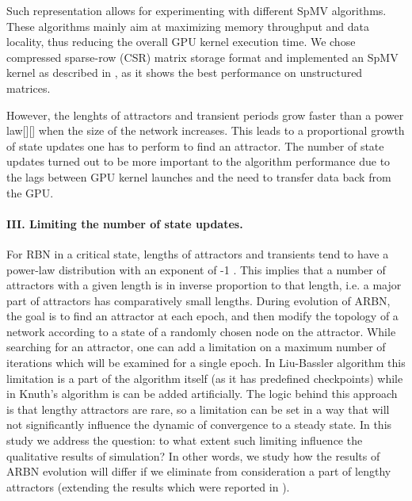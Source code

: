 \documentclass[procedia]{easychair}
\begin{document}
	 Such representation allows for experimenting with different SpMV algorithms. These algorithms mainly aim at maximizing memory throughput and data locality, thus reducing the overall GPU kernel execution time. We chose compressed sparse-row (CSR) matrix storage format and implemented an SpMV kernel as described in \cite{bell2008efficient}, as it shows the best performance on unstructured matrices.
	
	However, the lenghts of attractors and transient periods grow faster than a power law[][] when the size of the network increases. This leads to a proportional growth of state updates one has to perform to find an attractor. The number of state updates turned out to be more important to the algorithm performance due to the lags between GPU kernel launches and the need to transfer data back from the GPU. 
	
	\paragraph{III. Limiting the number of state updates.} For RBN in a critical state, lengths of attractors and transients tend to have a power-law distribution with an exponent of -1 \cite{greil2009attractor}. This implies that a number of attractors with a given length is in inverse proportion to that length, i.e. a major part of attractors has comparatively small lengths. During evolution of ARBN, the goal is to find an attractor at each epoch, and then modify the topology of a network according to a state of a randomly chosen node on the attractor. While searching for an attractor, one can add a limitation on a maximum number of iterations which will be examined for a single epoch. In Liu-Bassler algorithm this limitation is a part of the algorithm itself (as it has predefined checkpoints) while in Knuth's algorithm is can be added artificially. The logic behind this approach is that lengthy attractors are rare, so a limitation can be set in a way that will not significantly influence the dynamic of convergence to a steady state. In this study we address the question: to what extent such limiting influence the qualitative results of simulation? In other words, we study how the results of ARBN evolution will differ if we eliminate from consideration a part of lengthy attractors (extending the results which were reported in \cite{Gorski2016}).
\end{document}
